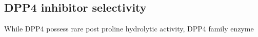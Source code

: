 \subsection{DPP4 inhibitor selectivity}
While DPP4 possess rare post proline hydrolytic activity, DPP4 family enzyme 
